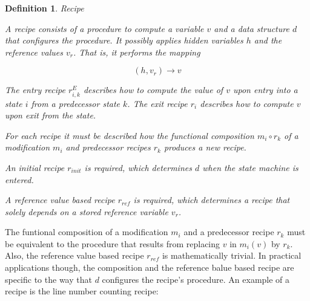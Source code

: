 \documentclass[12pt,a4paper]{scrartcl}
\newtheorem{definition}{Definition}
\begin{document}
\begin{definition} Recipe 

    A recipe consists of a procedure to compute a variable $v$ and a data
    structure $d$ that configures the procedure. It possibly applies hidden
    variables $h$ and the reference values $v_r$. That is, it performs the
    mapping

    \begin{equation} \label{eq:recipe-procedure}
        (h, v_r) \rightarrow v 
    \end{equation}

    The entry recipe $r^E_{i,k}$ describes how to compute the value of $v$ upon
    entry into a state $i$ from a predecessor state $k$. The exit recipe $r_i$
    describes how to compute $v$ upon exit from the state.

    For each recipe it must be described how the functional composition
    $m_i\circ r_k$ of a modification $m_i$ and predecessor recipes $r_k$
    produces a new recipe. 

    An initial recipe $r_{init}$ is required, which determines $d$ when the
    state machine is entered. 

    A reference value based recipe $r_{ref}$ is required, which determines
    a recipe that solely depends on a stored reference variable $v_r$.

\end{definition}

The funtional composition of a modification $m_i$ and a predecessor recipe
$r_k$ must be equivalent to the procedure that results from replacing $v$ in
$m_i(v)$ by $r_k$. Also, the reference value based recipe $r_{ref}$ is
mathematically trivial. In practical applications though, the composition and
the reference balue based recipe are specific to the way that $d$ configures
the recipe's procedure. An example of a recipe is the line number counting
recipe:
\end{document}
